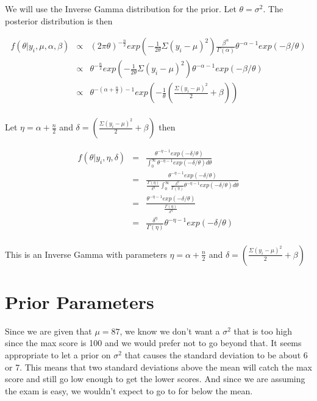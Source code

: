 \documentclass[12pt]{article}
\begin{document}
\noindent We will use the Inverse Gamma distribution for the prior.  Let $\theta=\sigma^2$.  The posterior distribution is then

\begin{eqnarray*}
f(\theta|y_i,\mu,\alpha,\beta) &\propto& (2\pi\theta)^{-\frac{n}{2}}exp\left(-\frac{1}{2\theta}\Sigma(y_i-\mu)^2\right)\frac{\beta^\alpha}{\Gamma(\alpha)}\theta^{-\alpha-1}exp(-\beta/\theta) \\
&\propto& \theta^{-\frac{n}{2}}exp\left(-\frac{1}{2\theta}\Sigma(y_i-\mu)^2\right)\theta^{-\alpha-1}exp(-\beta/\theta) \\
&\propto& \theta^{-(\alpha+\frac{n}{2})-1}exp\left(-\frac{1}{\theta}\left(\frac{\Sigma(y_i-\mu)^2}{2}+\beta\right)\right) \\
\end{eqnarray*}

\noindent Let $\eta=\alpha+\frac{n}{2}$ and $\delta=\left(\frac{\Sigma(y_i-\mu)^2}{2}+\beta\right)$ then

\begin{eqnarray*}
f(\theta|y_i,\eta,\delta) &=& \frac{\theta^{-\eta-1}exp(-\delta/\theta)}{\int_0^\infty\theta^{-\eta-1}exp(-\delta/\theta)d\theta} \\
&=& \frac{\theta^{-\eta-1}exp(-\delta/\theta)}{\frac{\Gamma(\eta)}{\delta^\eta}\int_0^\infty\frac{\delta^\eta}{\Gamma(\eta)}\theta^{-\eta-1}exp(-\delta/\theta)d\theta} \\
&=& \frac{\theta^{-\eta-1}exp(-\delta/\theta)}{\frac{\Gamma(\eta)}{\delta^\eta}} \\
&=& \frac{\delta^\eta}{\Gamma(\eta)}\theta^{-\eta-1}exp(-\delta/\theta) \\
\end{eqnarray*}

\noindent This is an Inverse Gamma with parameters $\eta=\alpha+\frac{n}{2}$ and $\delta=\left(\frac{\Sigma(y_i-\mu)^2}{2}+\beta\right)$

\section*{Prior Parameters}

\noindent Since we are given that $\mu=87$, we know we don't want a $\sigma^2$ that is too high since the max score is 100 and we would prefer not to go beyond that.  It seems appropriate to let a prior on $\sigma^2$ that causes the standard deviation to be about 6 or 7.  This means that two standard deviations above the mean will catch the max score and still go low enough to get the lower scores.  And since we are assuming the exam is easy, we wouldn't expect to go to for below the mean.
\end{document}

